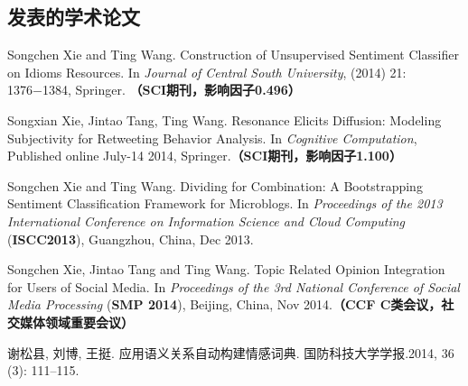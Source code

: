\begin{resume}

  \section*{发表的学术论文} %

  \begin{enumerate}[{[}1{]}]
  \addtolength{\itemsep}{-.36\baselineskip}%
  
  \item Songchen Xie and Ting Wang. Construction of Unsupervised Sentiment Classifier on Idioms Resources. In {\it Journal of Central South University}, (2014) 21: 1376−1384, Springer. \textbf{（SCI期刊，影响因子0.496）}
 
 \item Songxian Xie, Jintao Tang, Ting Wang. Resonance Elicits Diffusion: Modeling Subjectivity for Retweeting Behavior Analysis. In {\it Cognitive Computation}, Published online July-14 2014, Springer.\textbf{（SCI期刊，影响因子1.100）}

 \item Songchen Xie and Ting Wang. Dividing for Combination: A Bootstrapping Sentiment Classification Framework for Microblogs. In {\it Proceedings of the 2013 International Conference on Information Science and Cloud Computing} (\textbf{ISCC2013}), Guangzhou, China, Dec 2013.
 
 \item  Songchen Xie, Jintao Tang and Ting Wang. Topic Related Opinion Integration for Users of Social Media. In {\it Proceedings of the 3rd National Conference of Social Media Processing} (\textbf{SMP 2014}), Beijing, China, Nov 2014.\textbf{（CCF C类会议，社交媒体领域重要会议）}

\item 谢松县, 刘博, 王挺. 应用语义关系自动构建情感词典. 国防科技大学学报.2014, 36 (3): 111–115.

  \end{enumerate}

\end{resume}
